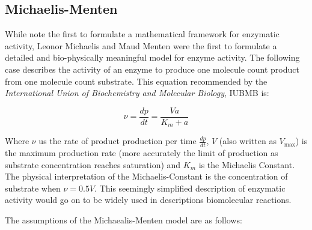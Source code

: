 \documentclass{article}
\begin{document}
  \subsection{Michaelis-Menten}
  While note the first to formulate a mathematical framework for enzymatic activity, Leonor
  Michaelis and Maud Menten were the first to formulate a detailed and bio-physically meaningful 
  model for enzyme activity. The following case describes the activity of an enzyme to
  produce one molecule count product from one molecule count substrate. This equation 
  recommended by the \textit{International Union of Biochemistry and Molecular Biology}, 
  IUBMB is:
  
\begin{equation}
  \nu = \frac{dp}{dt} = \frac{Va}{K_m+a}
\end{equation}

Where $\nu$ us the rate of product production per time $\frac{dp}{dt}$, $V$ (also written
as $V_{\max}$) is the maximum production rate (more accurately the limit of production as
substrate concentration reaches saturation) and $K_m$ is the Michaelis Constant. The
physical interpretation of the Michaelis-Constant is the concentration of substrate when 
$\nu={0.5}V$. This seemingly simplified description of enzymatic activity would go on to 
be widely used in descriptions biomolecular reactions.

The assumptions of the Michaealis-Menten model are as follows:
\end{document}
